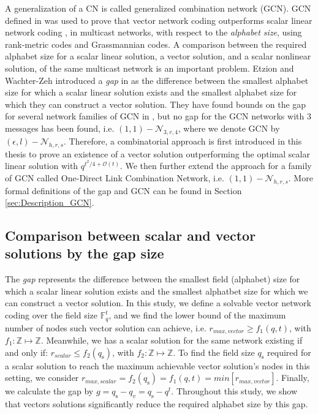 A generalization of a CN \cite{Riis:2006} is called generalized combination
network (GCN). GCN defined in \cite{Etzion:2016,Wachter-Zeh:2018}
was used to prove that vector network coding outperforms scalar linear
network coding , in multicast networks, with respect to the \textit{alphabet
size}, using rank-metric codes and Grassmannian codes. A comparison
between the required alphabet size for a scalar linear solution, a
vector solution, and a scalar nonlinear solution, of the same multicast
network is an important problem. Etzion and Wachter-Zeh introduced
a \textit{gap} in \cite{Etzion:2016} as the difference between the
smallest alphabet size for which a scalar linear solution exists and
the smallest alphabet size for which they can construct a vector solution.
They have found bounds on the gap for several network families of
GCN in \cite{Etzion:2016,Wachter-Zeh:2018}, but no gap for the GCN
networks with 3 messages has been found, i.e. $(1,1)-\mathcal{N}_{3,r,4}$,
where we denote GCN by $(\epsilon,l)-\mathcal{N}_{h,r,s}$. Therefore,
a combinatorial approach is first introduced in this thesis to prove
an existence of a vector solution outperforming the optimal scalar
linear solution with $q^{t^{2}/4+\mathcal{O}(t)}$. We then further
extend the approach for a family of GCN called One-Direct Link Combination
Network, i.e. $(1,1)-\mathcal{N}_{h,r,s}$. More formal definitions
of the gap and GCN can be found in Section \ref{sec:Description_GCN}.

\subsection{Comparison between scalar and vector solutions by the gap size \label{subsec:Comparison-between-scalar-and-vector-sol}}

The \textit{gap} represents the difference between the smallest field
(alphabet) size for which a scalar linear solution exists and the
smallest alphatbet size for which we can construct a vector solution.
In this study, we define a solvable vector network coding over the
field size $\ensuremath{\mathbb{F}}_{q}^{t}$, and we find the lower
bound of the maximum number of nodes such vector solution can achieve,
i.e. $r_{max,vector}\geq f_{1}(q,t)$, with $f_{1}:\mathbb{Z}\mapsto\mathbb{Z}$.
Meanwhile, we has a scalar solution for the same network existing
if and only if: $r_{scalar}\leq f_{2}\left(q_{\mathrm{s}}\right)$,
with $f_{2}:\mathbb{Z}\mapsto\mathbb{Z}$. To find the field size
$q_{\mathrm{s}}$ required for a scalar solution to reach the maximum
achievable vector solution's nodes in this setting, we consider $r_{max,scalar}=f_{2}\left(q_{\mathrm{s}}\right)=f_{1}(q,t)=min\left[r_{max,vector}\right]$.
Finally, we calculate the gap by $g=q_{\mathrm{s}}-q_{v}=q_{\mathrm{s}}-q^{t}.$
Throughout this study, we show that vectors solutions significantly
reduce the required alphabet size by this gap.

\clearpage